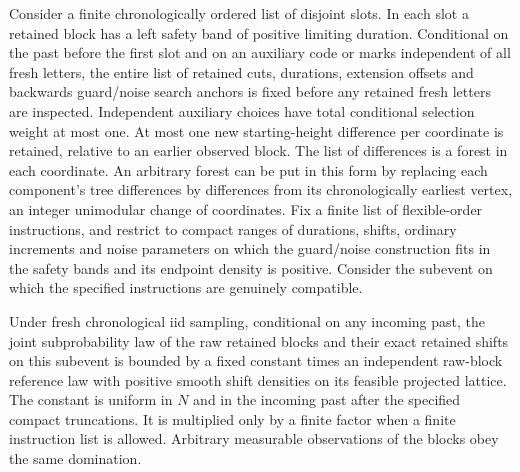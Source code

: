 \begin{proposition}\label{loc:slot-domination}
Consider a finite chronologically ordered list of disjoint slots.  In
each slot a retained block has a left safety band of positive limiting
duration.  Conditional on the past before the first slot and on an
auxiliary code or marks independent of all fresh letters, the entire
list of retained cuts, durations, extension offsets and backwards
guard/noise search anchors is fixed before any retained fresh letters
are inspected.  Independent auxiliary choices have total conditional
selection weight at most one.  At most one new starting-height difference per coordinate is
retained, relative to an earlier observed block.  The list of differences
is a forest in each coordinate.  An arbitrary forest can be put in this
form by replacing each component's tree differences by differences from
its chronologically earliest vertex, an integer unimodular change of
coordinates.  Fix a finite list of flexible-order
instructions, and restrict to compact ranges of durations, shifts,
ordinary increments and noise parameters on which the guard/noise
construction fits in the safety bands and its endpoint density is
positive.  Consider the subevent on which the specified instructions
are genuinely compatible.

Under fresh chronological iid sampling, conditional on any incoming
past, the joint subprobability law of the raw retained blocks and their
exact retained shifts on this subevent is bounded by a fixed constant
times an independent raw-block reference law with positive smooth shift
densities on its feasible projected lattice.  The constant is uniform
in $N$ and in the incoming past after the specified compact truncations.
It is multiplied only by a finite factor when a finite instruction list
is allowed.  Arbitrary measurable observations of the blocks obey the
same domination.
\end{proposition}

